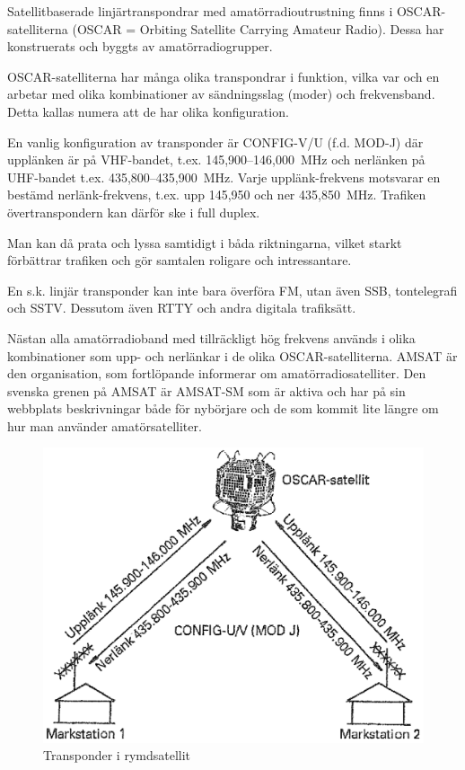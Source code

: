 Satellitbaserade linjärtranspondrar med amatörradioutrustning finns i
OSCAR-satelliterna (OSCAR = Orbiting Satellite Carrying Amateur Radio).
Dessa har konstruerats och byggts av amatörradiogrupper.

OSCAR-satelliterna har många olika transpondrar i funktion, vilka var och en
arbetar med olika kombinationer av sändningsslag (moder) och frekvensband.
Detta kallas numera att de har olika konfiguration.

En vanlig konfiguration av transponder är CONFIG-V/U (f.d. MOD-J) där
upplänken är på VHF-bandet, t.ex. 145,900--146,000~MHz och nerlänken på
UHF-bandet t.ex. 435,800--435,900~MHz.
Varje upplänk-frekvens motsvarar en bestämd nerlänk-frekvens, t.ex. upp
145,950 och ner 435,850~MHz.
Trafiken övertranspondern kan därför ske i full duplex.

Man kan då prata och lyssa samtidigt i båda riktningarna, vilket
starkt förbättrar trafiken och gör samtalen roligare och intressantare.

En s.k. linjär transponder kan inte bara överföra FM, utan även SSB,
tontelegrafi och SSTV.
Dessutom även RTTY och andra digitala trafiksätt.

Nästan alla amatörradioband med tillräckligt hög frekvens används i
olika kombinationer som upp- och nerlänkar i de olika OSCAR-satelliterna.
AMSAT är den organisation, som fortlöpande informerar om amatörradiosatelliter.
Den svenska grenen på AMSAT är AMSAT-SM som är aktiva och har på sin webbplats
beskrivningar både för nybörjare och de som kommit lite längre om hur man
använder amatörsatelliter.

\begin{figure}
  \includegraphics[width=\textwidth]{images/cropped_pdfs/bild_2_7-13.pdf}
  \caption{Transponder i rymdsatellit}
  \label{fig:bildII7-13}
\end{figure}

